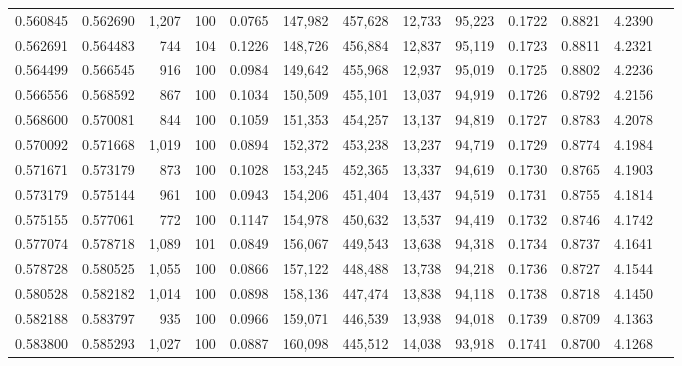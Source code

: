 \begin{tabular}{rrrrrrrrrrrrr}
0.560845 & 0.562690 & 1,207 & 100 &                                     0.0765 & 147,982 & 457,628 &  12,733 &  95,223 & 0.1722 & 0.8821 & 4.2390 \\
0.562691 & 0.564483 &   744 & 104 &                                     0.1226 & 148,726 & 456,884 &  12,837 &  95,119 & 0.1723 & 0.8811 & 4.2321 \\
0.564499 & 0.566545 &   916 & 100 &                                     0.0984 & 149,642 & 455,968 &  12,937 &  95,019 & 0.1725 & 0.8802 & 4.2236 \\
0.566556 & 0.568592 &   867 & 100 &                                     0.1034 & 150,509 & 455,101 &  13,037 &  94,919 & 0.1726 & 0.8792 & 4.2156 \\
0.568600 & 0.570081 &   844 & 100 &                                     0.1059 & 151,353 & 454,257 &  13,137 &  94,819 & 0.1727 & 0.8783 & 4.2078 \\
0.570092 & 0.571668 & 1,019 & 100 &                                     0.0894 & 152,372 & 453,238 &  13,237 &  94,719 & 0.1729 & 0.8774 & 4.1984 \\
0.571671 & 0.573179 &   873 & 100 &                                     0.1028 & 153,245 & 452,365 &  13,337 &  94,619 & 0.1730 & 0.8765 & 4.1903 \\
0.573179 & 0.575144 &   961 & 100 &                                     0.0943 & 154,206 & 451,404 &  13,437 &  94,519 & 0.1731 & 0.8755 & 4.1814 \\
0.575155 & 0.577061 &   772 & 100 &                                     0.1147 & 154,978 & 450,632 &  13,537 &  94,419 & 0.1732 & 0.8746 & 4.1742 \\
0.577074 & 0.578718 & 1,089 & 101 &                                     0.0849 & 156,067 & 449,543 &  13,638 &  94,318 & 0.1734 & 0.8737 & 4.1641 \\
0.578728 & 0.580525 & 1,055 & 100 &                                     0.0866 & 157,122 & 448,488 &  13,738 &  94,218 & 0.1736 & 0.8727 & 4.1544 \\
0.580528 & 0.582182 & 1,014 & 100 &                                     0.0898 & 158,136 & 447,474 &  13,838 &  94,118 & 0.1738 & 0.8718 & 4.1450 \\
0.582188 & 0.583797 &   935 & 100 &                                     0.0966 & 159,071 & 446,539 &  13,938 &  94,018 & 0.1739 & 0.8709 & 4.1363 \\
0.583800 & 0.585293 & 1,027 & 100 &                                     0.0887 & 160,098 & 445,512 &  14,038 &  93,918 & 0.1741 & 0.8700 & 4.1268 \\

\end{tabular}
